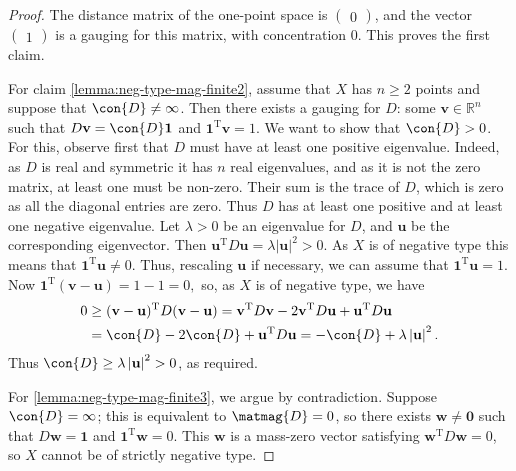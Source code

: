 \documentclass[a4paper, oneside, reqno]{amsart}
\theoremstyle{definition}
\theoremstyle{remark}
\numberwithin{equation}{section}
\renewcommand{\vec}{\mathbf}
\newcommand{\onevector}{\mathbf{1}}
\newcommand{\transpose}{\mathrm{T}}
\newcommand{\R}{\mathbb{R}}
\begin{document}
\begin{proof}
    The distance matrix of the one-point space is \(\begin{pmatrix} 0 \end{pmatrix}\), and the vector \(\begin{pmatrix} 1 \end{pmatrix}\) is a gauging for this matrix, with concentration 0. This proves the first claim.
    
    For claim \eqref{lemma:neg-type-mag-finite2}, assume that \(X\) has \(n \geq 2\) points and suppose that \(\con{D} \ne \infty\). Then there exists a gauging for \(D\): some \(\vec{v} \in \R^n\) such that  \(D\vec{v} = \con{D}\onevector\) and \(\onevector^\transpose \vec{v} = 1\). We want to show that \(\con{D} > 0\). For this, observe first that \(D\) must have at least one positive eigenvalue. Indeed, as \(D\) is real and symmetric it has \(n\) real eigenvalues, and as it is not the zero matrix, at least one must be non-zero. Their sum is the trace of \(D\), which is zero as all the diagonal entries are zero.  Thus \(D\) has at least one positive and at least one negative eigenvalue. Let \(\lambda > 0\) be an eigenvalue for \(D\), and \(\vec{u}\) be the corresponding eigenvector. Then \(\vec{u}^\transpose D \vec{u} = \lambda \left|\vec{u}\right|^2 > 0\).  As \(X\) is of negative type this means that \(\onevector^\transpose \vec{u} \ne 0\). Thus, rescaling \(\vec{u}\) if necessary, we can assume that \(\onevector^\transpose \vec{u} = 1\). Now
    \(
        \onevector^\transpose (\vec{v} - \vec{u})
        =
        1 - 1
        =
        0,
    \)
    so, as \(X\) is of negative type, we have
    \begin{align*}
        0 
        &\ge 
        (\vec{v} - \vec{u})^\transpose D (\vec{v} - \vec{u})
        =
        \vec{v}^\transpose D\vec{v}
        -
        2 \vec{v}^\transpose D \vec{u}
        +
        \vec{u}^\transpose D \vec{u}
        \\
        &= 
        \con{D} - 2 \con{D} + \vec{u}^\transpose D \vec{u}
        = -\con{D} + \lambda \left|\vec{u}\right|^2.
    \end{align*}
    Thus \(\con{D} \ge \lambda \left|\vec{u}\right|^2 > 0\), as required.
    
    For \eqref{lemma:neg-type-mag-finite3}, we argue by contradiction. Suppose \(\con{D} = \infty\); this is equivalent to \(\matmag{D} = 0\), so there exists \(\vec{w} \neq \vec{0}\) such that \(D\vec{w} = \onevector\) and \(\onevector^\transpose \vec{w} = 0\).  This  \(\vec{w}\) is a mass-zero vector satisfying \(\vec{w}^\transpose D \vec{w} = 0\), so \(X\) cannot be of strictly negative type. 
\end{proof}
\end{document}
